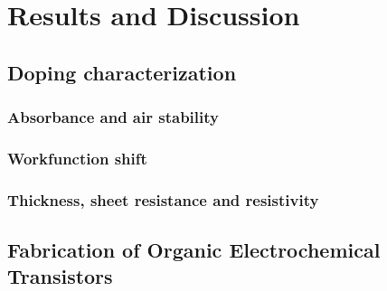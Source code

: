 \chapter{Results and Discussion}
\label{cha:3}

\section{Doping characterization}





\subsection{Absorbance and air stability}

\subsection{Workfunction shift}

\subsection{Thickness, sheet resistance and resistivity}


\section{Fabrication of Organic Electrochemical Transistors}


